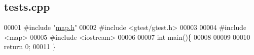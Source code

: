 \hypertarget{tests_8cpp_source}{\subsection{tests.\-cpp}
}

\begin{DoxyCode}
00001 \textcolor{preprocessor}{#include "\hyperlink{map_8h}{map.h}"}
00002 \textcolor{preprocessor}{#include <gtest/gtest.h>}
00003 
00004 \textcolor{preprocessor}{#include <map>}
00005 \textcolor{preprocessor}{#include <iostream>}
00006 
00007 \textcolor{keywordtype}{int} main()\{
00008 
00009 
00010     \textcolor{keywordflow}{return} 0;
00011 \}
\end{DoxyCode}

